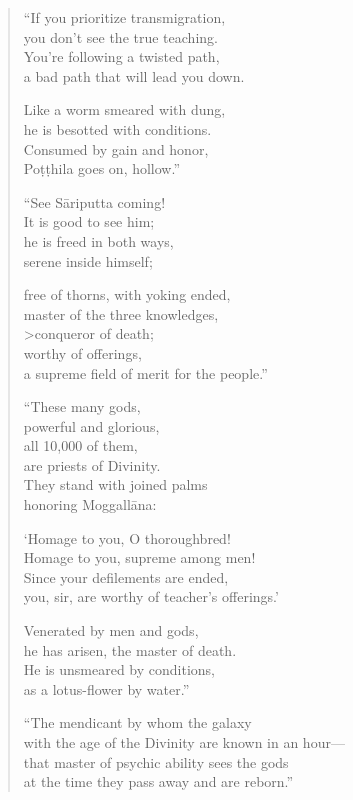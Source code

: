 \documentclass[12pt,openany]{book}%
\begin{document}
\begin{verse}
“If you prioritize transmigration, \\
you don’t see the true teaching. \\
You’re following a twisted path, \\
a bad path that will lead you down. 

Like a worm smeared with dung, \\
he is besotted with conditions. \\
Consumed by gain and honor, \\
\textsanskrit{Poṭṭhila} goes on, hollow.” 

“See \textsanskrit{Sāriputta} coming! \\
It is good to see him; \\
he is freed in both ways, \\
serene inside himself; 

free of thorns, with yoking ended, \\
master of the three knowledges, \\>conqueror of death; \\
worthy of offerings, \\
a supreme field of merit for the people.” 

“These many gods, \\
powerful and glorious, \\
all 10,000 of them, \\
are priests of Divinity. \\
They stand with joined palms \\
honoring \textsanskrit{Moggallāna}: 

‘Homage to you, O thoroughbred! \\
Homage to you, supreme among men! \\
Since your defilements are ended, \\
you, sir, are worthy of teacher’s offerings.’ 

Venerated by men and gods, \\
he has arisen, the master of death. \\
He is unsmeared by conditions, \\
as a lotus-flower by water.” 

“The mendicant by whom the galaxy \\
with the age of the Divinity are known in an hour—\\
that master of psychic ability sees the gods \\
at the time they pass away and are reborn.” 


\end{verse}
\end{document}

